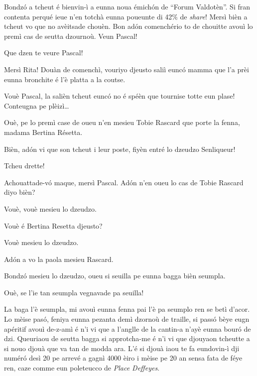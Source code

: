 \begin{drama}
\Ritaspeaks Bondzó a tcheut é bienvin-ì a eunna noua émichón de “Forum Valdotèn”. Si fran contenta perqué ieue n’en totchà eunna poueunte di 42$\%$ de \textit{share}! Mersì bièn a tcheut vo que no avèitsade chouèn. Bon adón comenchério to de chouitte avouì lo premì cas de seutta dzournoù. Veun Pascal!


\Ritaspeaks Que dzen te veure Pascal!

\Pascalspeaks Mersì Rita! Douàn de comenchì, vouriyo djeusto saliì euncó mamma que l’a prèi eunna bronchite é l’è platta a la coutse.

\Ritaspeaks {} Vouè Pascal, la salièn tcheut euncó no é spéèn que tournise totte eun plase! Conteugna pe plèizì\ldots

\Pascalspeaks Ouè, pe lo premì case de oueu n'en mesieu Tobie Rascard que porte la fenna, madama Bertina Résetta.


\Ritaspeaks Bièn, adón vi que son tcheut i leur poste, fiyèn entré lo dzeudzo Senliqueur!


\Pascalspeaks {} Tcheu drette! 

\DzeudzoSenliquerspeaks {} A\-chou\-at\-ta\-de-v\'o maque, mersì Pascal. Adón n'en oueu lo cas de Tobie Rascard  diyo bièn?

\Tobiespeaks Vouè, vouè mesieu lo dzeudzo.

\DzeudzoSenliquerspeaks Vouè é Bertina Resetta djeusto?

\Bertinaspeaks Vouè mesieu lo dzeudzo.

\DzeudzoSenliquerspeaks Adón a vo la paola mesieu Rascard.

\Tobiespeaks Bondzó mesieu lo dzeudzo, oueu si seuilla pe eunna bagga bièn seumpla.

\DzeudzoSenliquerspeaks Ouè, se l'ie tan seumpla vegnavade pa seuilla!

\Tobiespeaks La baga l'è seumpla, mi avouì eunna fenna pai l'è pa seumplo ren se betì d'acor. Lo mèise pas\'o, feniya eunna pezanta demì dzornoù de traille, si passó bèye eugn apéritif avouì de-z-amì é n’i vi que a l’anglle de la cantin-a n’ayè eunna bour\'o de dzi. Queuriaou de seutta bagga si approtcha-me é n’i vi que djouyaon tcheutte a si nouo djouà que va tan de modda ara. L’é si djouà iaou te fa eundovin-ì dji numéró desì 20 pe arrevé a gagnì 4000 èiro i mèise pe 20 an sensa fata de féye ren, caze comme eun poleteucco de \textit{Place Deffeyes}.


\end{drama}
